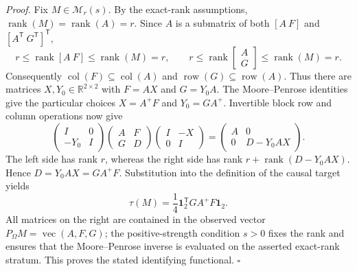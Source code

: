 \textit{Proof.}
Fix \(M\in\mathcal M_r(s)\).  By the exact-rank assumptions,
\(\operatorname{rank}(M)=\operatorname{rank}(A)=r\).  Since \(A\) is a
submatrix of both \([A\ F]\) and \([A^{\mathsf T}\ G^{\mathsf T}]^{\mathsf T}\),
\[
r\leq \operatorname{rank}[A\ F]\leq \operatorname{rank}(M)=r,
\qquad
r\leq \operatorname{rank}\!\begin{bmatrix}A\\G\end{bmatrix}
\leq \operatorname{rank}(M)=r.
\]
Consequently \(\operatorname{col}(F)\subseteq\operatorname{col}(A)\) and
\(\operatorname{row}(G)\subseteq\operatorname{row}(A)\).  Thus there are
matrices \(X,Y_0\in\mathbb R^{2\times2}\) with \(F=AX\) and \(G=Y_0A\).
The Moore--Penrose identities give the particular choices
\(X=A^+F\) and \(Y_0=GA^+\).  Invertible block row and column operations now give
\[
\begin{pmatrix}I&0\\-Y_0&I\end{pmatrix}
\begin{pmatrix}A&F\\G&D\end{pmatrix}
\begin{pmatrix}I&-X\\0&I\end{pmatrix}
=
\begin{pmatrix}A&0\\0&D-Y_0AX\end{pmatrix}.
\]
The left side has rank \(r\), whereas the right side has rank
\(r+\operatorname{rank}(D-Y_0AX)\).  Hence \(D=Y_0AX=GA^+F\).
Substitution into the definition of the causal target yields
\[
\tau(M)=\frac14\mathbf 1_2^{\mathsf T}GA^+F\mathbf 1_2.
\]
All matrices on the right are contained in the observed vector
\(P_{\Omega}M=\operatorname{vec}(A,F,G)\); the positive-strength condition
\(s>0\) fixes the rank and ensures that the Moore--Penrose inverse is evaluated
on the asserted exact-rank stratum.  This proves the stated identifying
functional. \(\square\)